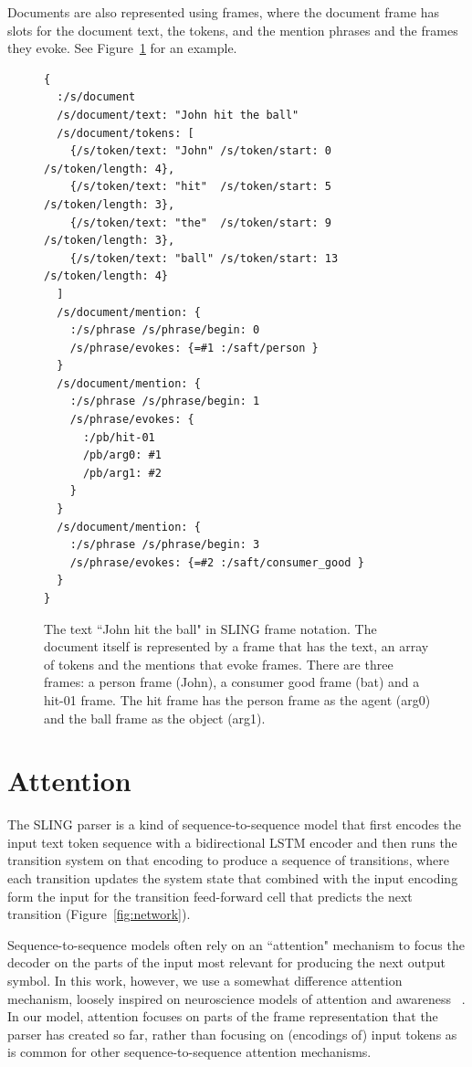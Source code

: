 \documentclass[11pt,a4paper]{article}
\begin{document}
Documents are also represented using frames, where the document frame has slots
for the document text, the tokens, and the mention phrases and the frames they
evoke. See Figure~\ref{fig:slingdoc} for an example.

\begin{figure}[t]
\begin{framed}
\begin{verbatim}
{
  :/s/document
  /s/document/text: "John hit the ball"
  /s/document/tokens: [
    {/s/token/text: "John" /s/token/start: 0  /s/token/length: 4},
    {/s/token/text: "hit"  /s/token/start: 5  /s/token/length: 3},
    {/s/token/text: "the"  /s/token/start: 9  /s/token/length: 3},
    {/s/token/text: "ball" /s/token/start: 13 /s/token/length: 4}
  ]
  /s/document/mention: {
    :/s/phrase /s/phrase/begin: 0
    /s/phrase/evokes: {=#1 :/saft/person }
  }
  /s/document/mention: {
    :/s/phrase /s/phrase/begin: 1
    /s/phrase/evokes: {
      :/pb/hit-01
      /pb/arg0: #1
      /pb/arg1: #2
    }
  }
  /s/document/mention: {
    :/s/phrase /s/phrase/begin: 3
    /s/phrase/evokes: {=#2 :/saft/consumer_good }
  }
}
\end{verbatim}
\end{framed}
\caption{The text ``John hit the ball" in SLING frame notation. The document
itself is represented by a frame that has the text, an array of tokens and
the mentions that evoke frames. There are three frames: a person frame (John),
a consumer good frame (bat) and a hit-01 frame. The hit frame has the person
frame as the agent (arg0) and the ball frame as the object (arg1).}
\label{fig:slingdoc}
\end{figure}

\section{Attention}
\label{sec:att}

The SLING parser is a kind of sequence-to-sequence model that first encodes the
input text token sequence with a bidirectional LSTM encoder and then runs
the transition system on that encoding to produce a sequence of transitions,
where each transition updates the system state that combined with the input
encoding form the input for the transition feed-forward cell that predicts the
next transition (Figure~\ref{fig:network}).

Sequence-to-sequence models often rely on an ``attention" mechanism to focus
the decoder on the parts of the input most relevant for producing the next
output symbol. In this work, however, we use a somewhat difference attention
mechanism, loosely inspired on neuroscience models of attention and awareness
~\cite{nelson2017,graziano2013}. In our model, attention focuses on parts of the
frame representation that the parser has created so far, rather than focusing
on (encodings of) input tokens as is common for other sequence-to-sequence
attention mechanisms.
\end{document}
